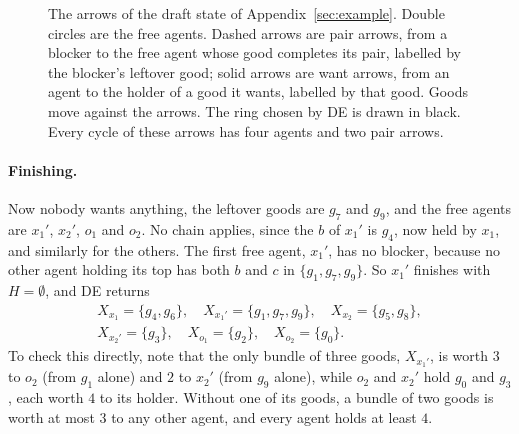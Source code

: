 \documentclass[runningheads,11pt]{llncs}
\newcommand{\DE}{\textup{DE}}
\begin{document}
\begin{figure}[tb]
\centering
{}
\caption{The arrows of the draft state of Appendix~\ref{sec:example}. Double circles are the free agents. Dashed arrows are pair arrows, from a blocker to the free agent whose good completes its pair, labelled by the blocker's leftover good; solid arrows are want arrows, from an agent to the holder of a good it wants, labelled by that good. Goods move against the arrows. The ring chosen by \DE{} is drawn in black. Every cycle of these arrows has four agents and two pair arrows.}\label{fig:cycle}
\end{figure}

\paragraph{Finishing.} Now nobody wants anything, the leftover goods are $g_7$ and $g_9$, and the free agents are $x_1'$, $x_2'$, $o_1$ and $o_2$. No chain applies, since the $b$ of $x_1'$ is $g_4$, now held by $x_1$, and similarly for the others. The first free agent, $x_1'$, has no blocker, because no other agent holding its top has both $b$ and $c$ in $\{g_1,g_7,g_9\}$. So $x_1'$ finishes with $H=\emptyset$, and \DE{} returns
\begin{gather*}
X_{x_1}=\{g_4,g_6\},\quad X_{x_1'}=\{g_1,g_7,g_9\},\quad X_{x_2}=\{g_5,g_8\},\\
X_{x_2'}=\{g_3\},\quad X_{o_1}=\{g_2\},\quad X_{o_2}=\{g_0\}.
\end{gather*}
To check this directly, note that the only bundle of three goods, $X_{x_1'}$, is worth $3$ to $o_2$ (from $g_1$ alone) and $2$ to $x_2'$ (from $g_9$ alone), while $o_2$ and $x_2'$ hold $g_0$ and $g_3$, each worth $4$ to its holder. Without one of its goods, a bundle of two goods is worth at most $3$ to any other agent, and every agent holds at least $4$.
\end{document}
